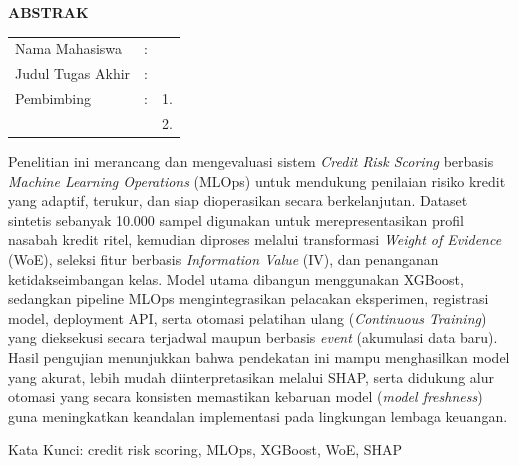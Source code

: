 \begin{center}
  \large\textbf{ABSTRAK}
\end{center}


\vspace{2ex}

\begingroup
\setlength{\tabcolsep}{0pt}

\noindent
\begin{tabularx}{\textwidth}{l >{\centering}m{2em} X}
  Nama Mahasiswa    & : & \name{}         \\

  Judul Tugas Akhir & : & \tatitle{}      \\

  Pembimbing        & : & 1. \advisor{}   \\
                    &   & 2. \coadvisor{} \\
\end{tabularx} 
\endgroup

Penelitian ini merancang dan mengevaluasi sistem \textit{Credit Risk Scoring} berbasis \textit{Machine Learning Operations} (MLOps) untuk mendukung penilaian risiko kredit yang adaptif, terukur, dan siap dioperasikan secara berkelanjutan. Dataset sintetis sebanyak 10.000 sampel digunakan untuk merepresentasikan profil nasabah kredit ritel, kemudian diproses melalui transformasi \textit{Weight of Evidence} (WoE), seleksi fitur berbasis \textit{Information Value} (IV), dan penanganan ketidakseimbangan kelas. Model utama dibangun menggunakan XGBoost, sedangkan pipeline MLOps mengintegrasikan pelacakan eksperimen, registrasi model, deployment API, serta otomasi pelatihan ulang (\textit{Continuous Training}) yang dieksekusi secara terjadwal maupun berbasis \textit{event} (akumulasi data baru). Hasil pengujian menunjukkan bahwa pendekatan ini mampu menghasilkan model yang akurat, lebih mudah diinterpretasikan melalui SHAP, serta didukung alur otomasi yang secara konsisten memastikan kebaruan model (\textit{model freshness}) guna meningkatkan keandalan implementasi pada lingkungan lembaga keuangan.

Kata Kunci: credit risk scoring, MLOps, XGBoost, WoE, SHAP
